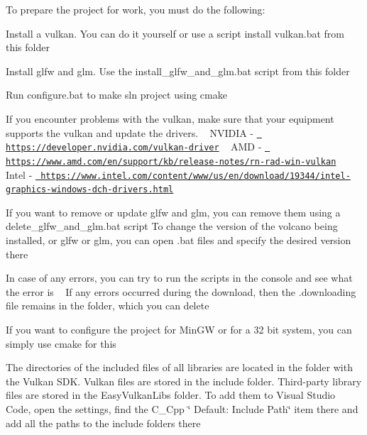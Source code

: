 To prepare the project for work, you must do the following\+:
\begin{DoxyEnumerate}
\item Install a vulkan. You can do it yourself or use a script install vulkan.\+bat from this folder
\item Install glfw and glm. Use the install\+\_\+glfw\+\_\+and\+\_\+glm.\+bat script from this folder
\item Run configure.\+bat to make sln project using cmake
\end{DoxyEnumerate}

If you encounter problems with the vulkan, make sure that your equipment supports the vulkan and update the drivers. ~\newline
 NVIDIA -\/ \href{https://developer.nvidia.com/vulkan-driver}{\texttt{ https\+://developer.\+nvidia.\+com/vulkan-\/driver}} ~\newline
 AMD -\/ \href{https://www.amd.com/en/support/kb/release-notes/rn-rad-win-vulkan}{\texttt{ https\+://www.\+amd.\+com/en/support/kb/release-\/notes/rn-\/rad-\/win-\/vulkan}} ~\newline
 Intel -\/ \href{https://www.intel.com/content/www/us/en/download/19344/intel-graphics-windows-dch-drivers.html}{\texttt{ https\+://www.\+intel.\+com/content/www/us/en/download/19344/intel-\/graphics-\/windows-\/dch-\/drivers.\+html}} ~\newline


If you want to remove or update glfw and glm, you can remove them using a delete\+\_\+glfw\+\_\+and\+\_\+glm.\+bat script To change the version of the volcano being installed, or glfw or glm, you can open .bat files and specify the desired version there

In case of any errors, you can try to run the scripts in the console and see what the error is ~\newline
 If any errors occurred during the download, then the .downloading file remains in the folder, which you can delete

If you want to configure the project for Min\+GW or for a 32 bit system, you can simply use cmake for this

The directories of the included files of all libraries are located in the folder with the Vulkan SDK. Vulkan files are stored in the include folder. Third-\/party library files are stored in the Easy\+Vulkan\+Libs folder. To add them to Visual Studio Code, open the settings, find the C\+\_\+\+Cpp \char`\"{} Default\+: Include Path\char`\"{} item there and add all the paths to the include folders there 